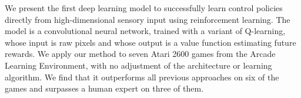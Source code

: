 
We present the first deep learning model to successfully learn control policies directly from high-dimensional sensory input using reinforcement learning. 
The model is a convolutional neural network, trained with a variant of Q-learning, whose input is raw pixels and whose output is a value function estimating future rewards.
We apply our method to seven Atari 2600 games from the Arcade Learning Environment, with no adjustment of the architecture or learning algorithm.
We find that it outperforms all previous approaches on six of the games and surpasses a human expert on three of them.
% 
% 
